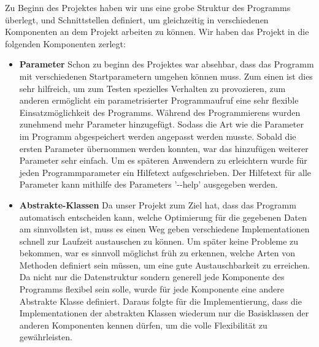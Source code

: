 \documentclass[
	12pt,
	a4paper,
	BCOR10mm,
	DIV14,
	headsepline,
]{scrreprt}
\begin{document}
	Zu Beginn des Projektes haben wir uns eine grobe Struktur des Programms überlegt, und Schnittstellen definiert, um gleichzeitig in verschiedenen Komponenten an dem Projekt arbeiten zu können. Wir haben das Projekt in die folgenden Komponenten zerlegt:
	\begin{itemize}
		\item \textbf{Parameter} Schon zu beginn des Projektes war absehbar, dass das Programm mit verschiedenen Startparametern umgehen können muss. Zum einen ist dies sehr hilfreich, um zum Testen spezielles Verhalten zu provozieren, zum anderen ermöglicht ein parametrisierter Programmaufruf eine sehr flexible Einsatzmöglichkeit des Programms. Während des Programmierens wurden zunehmend mehr Parameter hinzugefügt. Sodass die Art wie die Parameter im Programm abgespeichert werden angepasst werden musste. Sobald die ersten Parameter übernommen werden konnten, war das hinzufügen weiterer Parameter sehr einfach. Um es späteren Anwendern zu erleichtern wurde für jeden Programmparameter ein Hilfetext aufgeschrieben. Der Hilfetext für alle Parameter kann mithilfe des Parameters '-{}-help' ausgegeben werden.
		\item \textbf{Abstrakte-Klassen} Da unser Projekt zum Ziel hat, dass das Programm automatisch entscheiden kann, welche Optimierung für die gegebenen Daten am sinnvollsten ist, muss es einen Weg geben verschiedene Implementationen schnell zur Laufzeit austauschen zu können. Um später keine Probleme zu bekommen, war es sinnvoll möglichst früh zu erkennen, welche Arten von Methoden definiert sein müssen, um eine gute Austauschbarkeit zu erreichen. Da nicht nur die Datenstruktur sondern generell jede Komponente des Programms flexibel sein solle, wurde für jede Komponente eine andere Abstrakte Klasse definiert. Daraus folgte für die Implementierung, dass die Implementationen der abstrakten Klassen wiederum nur die Basisklassen der anderen Komponenten kennen dürfen, um die volle Flexibilität zu gewährleisten.

\end{itemize}
\end{document}

